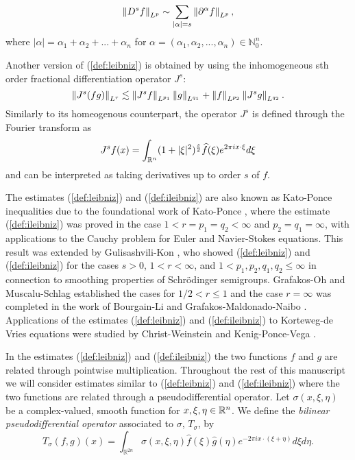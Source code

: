 
\[\left\|D^s f\right\|_{L^p} \sim \sum_{|\alpha| = s} \left\|\partial^\alpha f\right\|_{L^p},\]
where $|\alpha| = \alpha_1 + \alpha_2 + ... + \alpha_n$ for $\alpha = (\alpha_1,\alpha_2,...,\alpha_n) \in \mathbb{N}^n_0.$

 Another version of (\ref{def:leibniz}) is obtained by using the inhomogeneous sth order fractional differentiation operator $J^s$:
\begin{equation}\label{def:ileibniz}
\left\|J^s(fg)\right\|_{L^r} \lesssim \left\|J^s f\right\|_{L^{p_1}}\left\|g\right\|_{L^{q_1}} + \left\|f\right\|_{L^{p_2}}\left\|J^s g\right\|_{L^{q_2}}.
\end{equation}
Similarly to its homeogenous counterpart, the operator $J^s$ is defined through the Fourier transform as 
\[ J^s f(x) = \int_{{{\mathbb R}^n}} (1+|\xi|^2)^\frac{s}{2} \widehat{f}(\xi)e^{2\pi i x\cdot\xi} d\xi\]
and can be interpreted as taking derivatives up to order $s$ of $f$.
 
The estimates (\ref{def:leibniz}) and (\ref{def:ileibniz}) are also known as Kato-Ponce inequalities due to the foundational work of Kato-Ponce \cite{MR951744}, where the estimate (\ref{def:ileibniz}) was proved in the case $1<r=p_1=q_2<\infty$ and $p_2=q_1=\infty$, with applications to the Cauchy problem for Euler and Navier-Stokes equations. This result was extended by Gulisashvili-Kon \cite{MR1420922}, who showed (\ref{def:leibniz}) and (\ref{def:ileibniz}) for the cases $s>0$, $1<r<\infty$, and $1 < p_1,p_2,q_1,q_2\leq\infty$ in connection to smoothing properties of Schr\"odinger semigroups. Grafakos-Oh \cite{MR3200091} and Muscalu-Schlag \cite{MR3052499} established the cases for $1/2 <r\leq 1$ and the case $r=\infty$ was completed in the work of Bourgain-Li \cite{MR3263081} and Grafakos-Maldonado-Naibo \cite{MR3189525}. Applications of the estimates (\ref{def:leibniz}) and (\ref{def:ileibniz}) to Korteweg-de Vries equations were studied by Christ-Weinstein \cite{MR1124294} and Kenig-Ponce-Vega \cite{MR1211741}.

In the estimates (\ref{def:leibniz}) and (\ref{def:ileibniz}) the two functions $f$ and $g$ are related through pointwise multiplication. Throughout the rest of this manuscript we will consider estimates similar to (\ref{def:leibniz}) and (\ref{def:ileibniz}) where the two functions are related through a pseudodifferential operator. Let $\sigma(x,\xi,\eta)$ be a complex-valued, smooth function for $x,\xi,\eta\in{{\mathbb R}^n}$. We define the \textit{bilinear pseudodifferential operator}  associated to $\sigma$, $T_\sigma$, by 
\begin{equation}\label{psydo}
T_{\sigma}(f,g)(x) = \int_{\mathbb{R}^{2n}} \sigma(x,\xi,\eta) \widehat{f}(\xi)\widehat{g}(\eta)e^{-2\pi i x\cdot(\xi+\eta)}d\xi d\eta. 
\end{equation}

